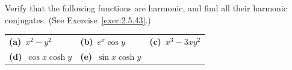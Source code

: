 \begin{exerciselist}
  \item\label{exer:2.5.44} Verify that the following functions are harmonic, and find all their
        harmonic conjugates. (See Exercise~\ref{exer:2.5.43}.)

  \begin{tabular}[t]{@{}p{112pt}@{}p{112pt}p{112pt}}
    {\bf (a)}\  $x^{2}-y^{2}$   & {\bf (b)}\  $e^{x}\cos y$   & {\bf (c)}\  $x^{3}-3xy^{2}$ \\
    {\bf (d)}\  $\cos x\cosh y$ & {\bf (e)}\  $\sin x\cosh y$ &
  \end{tabular}
\end{exerciselist}
